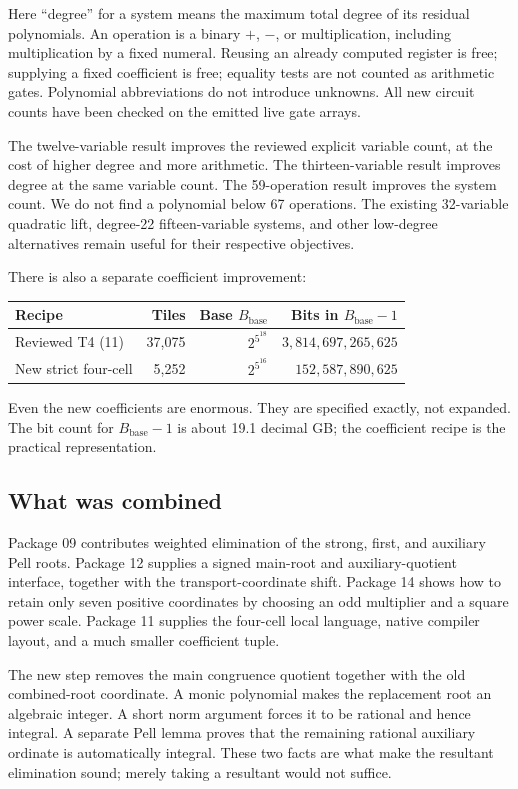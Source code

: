 \documentclass[11pt,letterpaper]{article}
\theoremstyle{remark}\newtheorem{remark}[theorem]{Remark}
\begin{document}
Here ``degree'' for a system means the maximum total degree of its residual
polynomials. An operation is a binary $+$, $-$, or multiplication, including
multiplication by a fixed numeral. Reusing an already computed register is
free; supplying a fixed coefficient is free; equality tests are not counted
as arithmetic gates. Polynomial abbreviations do not introduce unknowns.
All new circuit counts have been checked on the emitted live gate arrays.

The twelve-variable result improves the reviewed explicit variable count, at
the cost of higher degree and more arithmetic. The thirteen-variable result
improves degree at the same variable count. The 59-operation result improves
the system count. We do not find a polynomial below 67 operations. The existing
32-variable quadratic lift, degree-22 fifteen-variable systems, and other
low-degree alternatives remain useful for their respective objectives.

There is also a separate coefficient improvement:
\begin{center}
\begin{tabular}{lrrr}\toprule
Recipe & Tiles & Base $B_{\mathrm{base}}$ & Bits in $B_{\mathrm{base}}-1$\\\midrule
Reviewed T4 (11)&37,075&$2^{5^{18}}$&$3,814,697,265,625$\\
New strict four-cell&5,252&$2^{5^{16}}$&$152,587,890,625$\\\bottomrule
\end{tabular}
\end{center}
Even the new coefficients are enormous. They are specified exactly, not
expanded. The bit count for $B_{\mathrm{base}}-1$ is about 19.1 decimal GB;
the coefficient recipe is the practical representation.

\subsection{What was combined}
Package 09 contributes weighted elimination of the strong, first, and auxiliary
Pell roots. Package 12 supplies a signed main-root and auxiliary-quotient
interface, together with the transport-coordinate shift. Package 14 shows
how to retain only seven positive coordinates by choosing an odd multiplier
and a square power scale. Package 11 supplies the four-cell local language,
native compiler layout, and a much smaller coefficient tuple.

The new step removes the main congruence quotient together with the old
combined-root coordinate. A monic polynomial makes the replacement root an
algebraic integer. A short norm argument forces it to be rational and hence
integral. A separate Pell lemma proves that the remaining rational auxiliary
ordinate is automatically integral. These two facts are what make the
resultant elimination sound; merely taking a resultant would not suffice.
\end{document}

